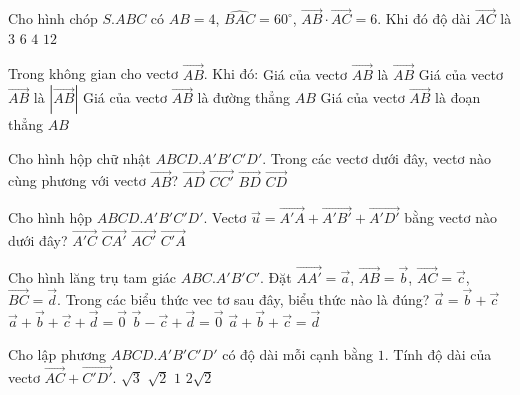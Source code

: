 \begin{ex}
	Cho hình chóp $S.ABC$ có $AB=4$, $\widehat{BAC}=60^\circ$, $\vec{AB} \cdot \vec{AC}=6$. Khi đó độ dài $\vec{AC}$ là
	\choice
	{\True $3$}
	{$6$}
	{$4$}
	{$12$}
\end{ex}
\begin{ex}
	Trong không gian cho vectơ $\vec{AB}$. Khi đó:
	\choice
	{Giá của vectơ $\vec{AB}$ là $\vec{AB}$}
	{Giá của vectơ $\vec{AB}$ là $\left| \vec{AB} \right|$}
	{\True Giá của vectơ $\vec{AB}$ là đường thẳng $AB$}
	{Giá của vectơ $\vec{AB}$ là đoạn thẳng $AB$}
\end{ex}
\begin{ex}
	Cho hình hộp chữ nhật $ABCD.A'B'C'D'$. Trong các vectơ dưới đây, vectơ nào cùng phương với vectơ $\vec{AB}$?
	\choice
	{$\vec{AD}$}
	{$\vec{CC'}$}
	{$\vec{BD}$}
	{\True $\vec{CD}$}
\end{ex}
\begin{ex}
	Cho hình hộp $ABCD.A'B'C'D'$. Vectơ $\vec{u}=\vec{A'A}+\vec{A'B'}+\vec{A'D'}$ bằng vectơ nào dưới đây?
	\choice
	{\True $\vec{A'C}$}
	{$\vec{CA'}$}
	{$\vec{AC'}$}
	{$\vec{C'A}$}
\end{ex}
\begin{ex}
	Cho hình lăng trụ tam giác $ABC.A'B'C'$. Đặt $\vec{AA'}=\vec{a}$, $\vec{AB}=\vec{b}$, $\vec{AC}=\vec{c}$, $\vec{BC}=\vec{d}$. Trong các biểu thức vec tơ sau đây, biểu thức nào là đúng?
	\choice
	{$\vec{a}=\vec{b}+\vec{c}$}
	{$\vec{a}+\vec{b}+\vec{c}+\vec{d}=\vec{0}$}
	{\True $\vec{b}-\vec{c}+\vec{d}=\vec{0}$}
	{$\vec{a}+\vec{b}+\vec{c}=\vec{d}$}
\end{ex}
\begin{ex}
	Cho lập phương $ABCD.A'B'C'D'$ có độ dài mỗi cạnh bằng $1$. Tính độ dài của vectơ $\vec{AC}+\vec{C'D'}$.
	\choice
	{$\sqrt{3}$}
	{$\sqrt{2}$}
	{\True $1$}
	{$2\sqrt{2}$}
\end{ex}
